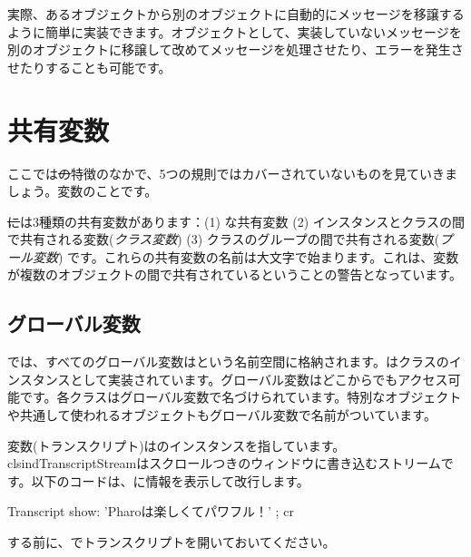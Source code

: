 \documentclass[a4paper,10pt,twoside]{book}
\begin{document}
実際、あるオブジェクトから別のオブジェクトに自動的にメッセージを移譲するように簡単に実装できます。オブジェクトとして、実装していないメッセージを別のオブジェクトに移譲して改めてメッセージを処理させたり、エラーを発生させたりすることも可能です。

\section{共有変数}

ここでは\st の特徴のなかで、5つの規則ではカバーされていないものを見ていきましょう。変数のことです。

\st には3種類の共有変数があります：(1) な共有変数 (2) インスタンスとクラスの間で共有される変数(\emph{クラス変数}) (3) クラスのグループの間で共有される変数(\emph{プール変数}) です。これらの共有変数の名前は大文字で始まります。これは、変数が複数のオブジェクトの間で共有されているということの警告となっています。

\subsection{グローバル変数}
\pharo では、すべてのグローバル変数はという名前空間に格納されます。はクラスのインスタンスとして実装されています。グローバル変数はどこからでもアクセス可能です。各クラスはグローバル変数で名づけられています。特別なオブジェクトや共通して使われるオブジェクトもグローバル変数で名前がついています。

変数(トランスクリプト)はのインスタンスを指しています。clsind{TranscriptStream}はスクロールつきのウィンドウに書き込むストリームです。以下のコードは、に情報を表示して改行します。

\begin{code}{}
Transcript show: 'Pharoは楽しくてパワフル！' ; cr
\end{code}

\noindent
{}する前に、でトランスクリプトを開いておいてください。

\end{document}
